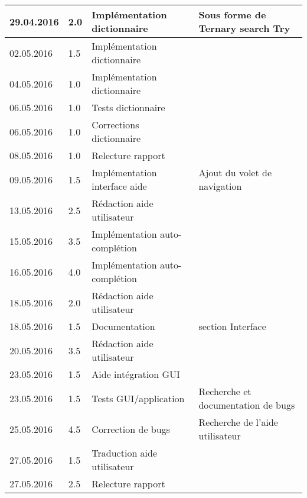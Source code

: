 \documentclass[french]{article}
\begin{document}
\begin{longtable}{p{}|p{}|p{}|p{}}
		29.04.2016 & 2.0 & Implémentation dictionnaire & Sous forme de Ternary search Try\\
		\hline
		02.05.2016 & 1.5 & Implémentation dictionnaire & \\
		04.05.2016 & 1.0 & Implémentation dictionnaire & \\
		06.05.2016 & 1.0 & Tests dictionnaire & \\
		06.05.2016 & 1.0 & Corrections dictionnaire & \\
		08.05.2016 & 1.0 & Relecture rapport & \\
		\hline
		09.05.2016 & 1.5 & Implémentation interface aide & Ajout du volet de navigation \\
		13.05.2016 & 2.5 & Rédaction aide utilisateur & \\
		15.05.2016 & 3.5 & Implémentation auto-complétion & \\
		\hline
		16.05.2016 & 4.0 & Implémentation auto-complétion & \\
		18.05.2016 & 2.0 & Rédaction aide utilisateur & \\
		18.05.2016 & 1.5 & Documentation & section Interface\\
		20.05.2016 & 3.5 & Rédaction aide utilisateur & \\
		\hline
		23.05.2016 & 1.5 & Aide intégration GUI & \\
		23.05.2016 & 1.5 & Tests GUI/application & Recherche et documentation de bugs\\
		25.05.2016 & 4.5 & Correction de bugs & Recherche de l'aide utilisateur\\
		27.05.2016 & 1.5 & Traduction aide utilisateur & \\
		27.05.2016 & 2.5 & Relecture rapport & \\
		
	\end{longtable}
	
\end{document}
